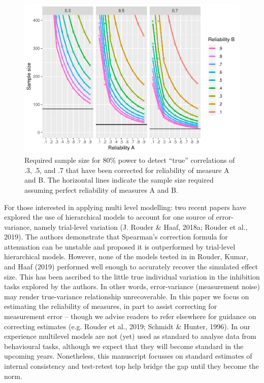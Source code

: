 \documentclass[english,,man,floatsintext]{apa6}
\begin{document}
\begin{figure}
\centering
\includegraphics{Parsons_Kruijt_Fox_-_reporting_reliability_files/figure-latex/figuretwo-1.pdf}
\caption{\label{fig:figuretwo}Required sample size for 80\% power to detect \enquote{true} correlations of .3, .5, and .7 that have been corrected for reliability of measure A and B. The horizontal lines indicate the sample size required assuming perfect reliability of measures A and B.}
\end{figure}

For those interested in applying multi level modelling: two recent papers have explored the use of hierarchical models to account for one source of error-variance, namely trial-level variation (J. Rouder \& Haaf, 2018a; Rouder et al., 2019). The authors demonstrate that Spearman's correction formula for attenuation can be unstable and proposed it is outperformed by trial-level hierarchical models. However, none of the models tested in in Rouder, Kumar, and Haaf (2019) performed well enough to accurately recover the simulated effect size. This has been ascribed to the little true individual variation in the inhibition tasks explored by the authors. In other words, error-variance (measurement noise) may render true-variance relationship unrecoverable. In this paper we focus on estimating the reliability of measures, in part to assist correcting for measurement error -- though we advise readers to refer elsewhere for guidance on correcting estimates (e.g. Rouder et al., 2019; Schmidt \& Hunter, 1996). In our experience multilevel models are not (yet) used as standard to analyse data from behavioural tasks, although we expect that they will become standard in the upcoming years. Nonetheless, this manuscript focusses on standard estimates of internal consistency and test-retest top help bridge the gap until they become the norm.
\end{document}
